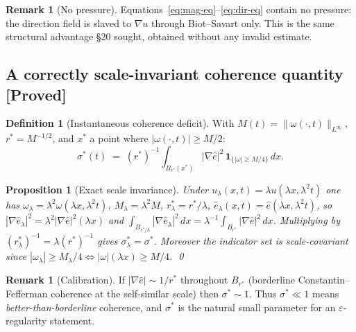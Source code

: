 \documentclass[11pt]{article}
\newtheorem{proposition}[theorem]{Proposition}
\theoremstyle{definition}
\newtheorem{definition}[theorem]{Definition}
\newtheorem{remark}[theorem]{Remark}
\theoremstyle{remark}
\begin{document}
\begin{remark}[No pressure]
  Equations~\eqref{eq:mag-eq}--\eqref{eq:dir-eq} contain no pressure: the
  direction field is slaved to $\nabla u$ through Biot--Savart only. This is
  the same structural advantage \S20 sought, obtained without any invalid
  estimate.
\end{remark}

\subsection{A correctly scale-invariant coherence quantity [Proved]}

\begin{definition}[Instantaneous coherence deficit]\label{def:sigma-star}
  With $M(t)=\|\omega(\cdot,t)\|_{L^\infty}$, $r^*=M^{-1/2}$, and $x^*$ a
  point where $|\omega(\cdot,t)|\geq M/2$:
  \begin{equation}\label{eq:sigma-star}
    \sigma^*(t) \;=\; (r^*)^{-1}\int_{B_{r^*}(x^*)} |\nabla\hat{e}|^2\,
      \mathbf{1}_{\{|\omega|\geq M/4\}}\,dx.
  \end{equation}
\end{definition}

\begin{proposition}[Exact scale invariance]\label{prop:sigma-star-invariant}
  Under $u_\lambda(x,t)=\lambda u(\lambda x,\lambda^2 t)$ one has
  $\omega_\lambda = \lambda^2\omega(\lambda x,\lambda^2 t)$,
  $M_\lambda=\lambda^2 M$, $r^*_\lambda = r^*/\lambda$,
  $\hat{e}_\lambda(x,t)=\hat{e}(\lambda x,\lambda^2 t)$, so
  $|\nabla\hat{e}_\lambda|^2 = \lambda^2|\nabla\hat{e}|^2(\lambda x)$ and
  $\int_{B_{r^*/\lambda}}|\nabla\hat{e}_\lambda|^2\,dx
   = \lambda^{-1}\int_{B_{r^*}}|\nabla\hat{e}|^2\,dx$. Multiplying by
  $(r^*_\lambda)^{-1}=\lambda(r^*)^{-1}$ gives
  $\sigma^*_\lambda = \sigma^*$. Moreover the indicator set is
  scale-covariant since $|\omega_\lambda|\geq M_\lambda/4 \iff
  |\omega|(\lambda x)\geq M/4$. \qed
\end{proposition}

\begin{remark}[Calibration]
  If $|\nabla\hat{e}|\sim 1/r^*$ throughout $B_{r^*}$ (borderline
  Constantin--Fefferman coherence at the self-similar scale) then
  $\sigma^*\sim 1$. Thus $\sigma^*\ll 1$ means \emph{better-than-borderline}
  coherence, and $\sigma^*$ is the natural small parameter for an
  $\varepsilon$-regularity statement.
\end{remark}
\end{document}
